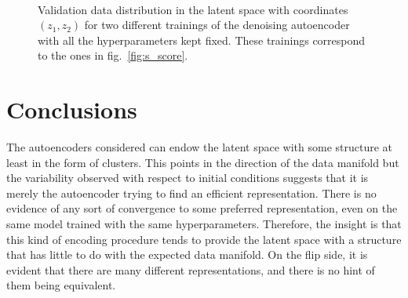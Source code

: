 \documentclass[twocolumn,gsifonts,twoside]{gsipaper}
\begin{document}
  \begin{figure}[htb]
  \\[-2ex]
  \caption{Validation data distribution in the latent space with coordinates $(z_1, z_2)$ for two different trainings of the denoising autoencoder with all the hyperparameters kept fixed. These trainings correspond to the ones in fig.~\ref{fig:s_score}.}
  \label{fig:scatter}
\end{figure}


\section{Conclusions}
The autoencoders considered can endow the latent space with some structure at least in the form of clusters. This points in the direction of the data manifold but the variability observed with respect to initial conditions suggests that it is merely the autoencoder trying to find an efficient representation. There is no evidence of any sort of convergence to some preferred representation, even on the same model trained with the same hyperparameters. Therefore, the insight is that this kind of encoding procedure tends to provide the latent space with a structure that has little to do with the expected data manifold. On the flip side, it is evident that there are many different representations, and there is no hint of them being equivalent. 
\end{document}
